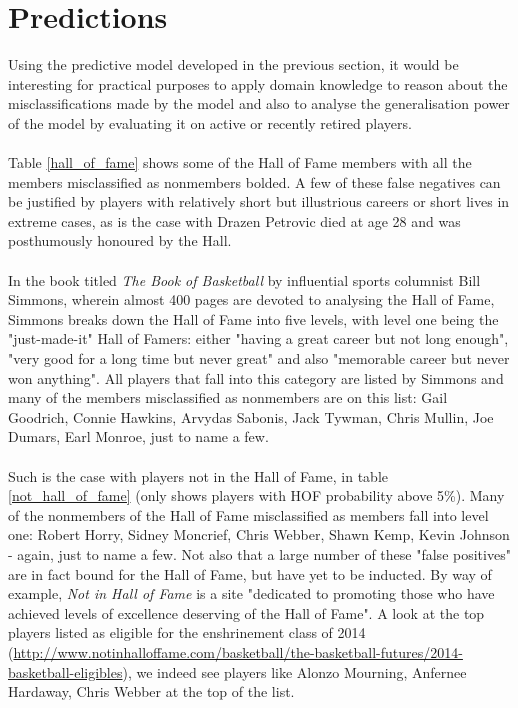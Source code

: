 \documentclass[paper=a4, fontsize=11pt]{scrartcl} %
\numberwithin{equation}{section} %
\numberwithin{figure}{section} %
\numberwithin{table}{section} %
\begin{document}
\section{Predictions}
Using the predictive model developed in the previous section, it would be interesting for practical purposes to apply domain knowledge to reason about the misclassifications made by the model and also to analyse the generalisation power of the model by evaluating it on active or recently retired players.\\
\\
Table \ref{hall_of_fame} shows some of the Hall of Fame members with all the members misclassified as nonmembers bolded. A few of these false negatives can be justified by players with relatively short but illustrious careers or short lives in extreme cases, as is the case with Drazen Petrovic died at age 28 and was posthumously honoured by the Hall.\\
\\
In the book titled \textit{The Book of Basketball} by influential sports columnist Bill Simmons, wherein almost 400 pages are devoted to analysing the Hall of Fame, Simmons breaks down the Hall of Fame into five levels, with level one being the "just-made-it" Hall of Famers: either "having a great career but not long enough", "very good for a long time but never great" and also "memorable career but never won anything". All players that fall into this category are listed by Simmons and many of the members misclassified as nonmembers are on this list: Gail Goodrich, Connie Hawkins, Arvydas Sabonis, Jack Tywman, Chris Mullin, Joe Dumars, Earl Monroe, just to name a few.\\
\\
Such is the case with players not in the Hall of Fame, in table \ref{not_hall_of_fame} (only shows players with HOF probability above 5\%). Many of the nonmembers of the Hall of Fame misclassified as members fall into level one: Robert Horry, Sidney Moncrief, Chris Webber, Shawn Kemp, Kevin Johnson - again, just to name a few. Not also that a large number of these "false positives" are in fact bound for the Hall of Fame, but have yet to be inducted. By way of example, \textit{Not in Hall of Fame} is a site "dedicated to promoting those who have achieved levels of excellence deserving of the Hall of Fame". A look at the top players listed as eligible for the enshrinement class of 2014 (\url{http://www.notinhalloffame.com/basketball/the-basketball-futures/2014-basketball-eligibles}), we indeed see players like Alonzo Mourning, Anfernee Hardaway, Chris Webber at the top of the list.\\
\end{document}
